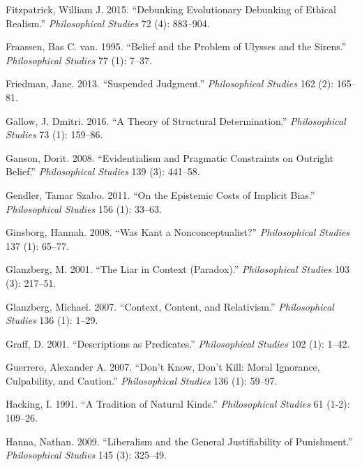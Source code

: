 \documentclass[
  10pt,
  letterpaper,
  DIV=11,
  numbers=noendperiod,
  twoside]{scrartcl}
\newlength{\cslhangindent}
\newenvironment{CSLReferences}[2] %
 {\begin{list}{}{%
  \setlength{\itemindent}{0pt}
  \setlength{\leftmargin}{0pt}
  \setlength{\parsep}{0pt}
  \ifodd #1
   \setlength{\leftmargin}{\cslhangindent}
   \setlength{\itemindent}{-1\cslhangindent}
  \fi
  \setlength{\itemsep}{#2\baselineskip}}}
 {\end{list}}
\begin{document}
\begin{CSLReferences}{1}{0}
Fitzpatrick, William J. 2015. {``Debunking Evolutionary Debunking of
Ethical Realism.''} \emph{Philosophical Studies} 72 (4): 883--904.

Fraassen, Bas C. van. 1995. {``Belief and the Problem of Ulysses and the
Sirens.''} \emph{Philosophical Studies} 77 (1): 7--37.

Friedman, Jane. 2013. {``Suspended Judgment.''} \emph{Philosophical
Studies} 162 (2): 165--81.

Gallow, J. Dmitri. 2016. {``A Theory of Structural Determination.''}
\emph{Philosophical Studies} 73 (1): 159--86.

Ganson, Dorit. 2008. {``Evidentialism and Pragmatic Constraints on
Outright Belief.''} \emph{Philosophical Studies} 139 (3): 441--58.

Gendler, Tamar Szabo. 2011. {``On the Epistemic Costs of Implicit
Bias.''} \emph{Philosophical Studies} 156 (1): 33--63.

Ginsborg, Hannah. 2008. {``Was Kant a Nonconceptualist?''}
\emph{Philosophical Studies} 137 (1): 65--77.

Glanzberg, M. 2001. {``The Liar in Context (Paradox).''}
\emph{Philosophical Studies} 103 (3): 217--51.

Glanzberg, Michael. 2007. {``Context, Content, and Relativism.''}
\emph{Philosophical Studies} 136 (1): 1--29.

Graff, D. 2001. {``Descriptions as Predicates.''} \emph{Philosophical
Studies} 102 (1): 1--42.

Guerrero, Alexander A. 2007. {``Don't Know, Don't Kill: Moral Ignorance,
Culpability, and Caution.''} \emph{Philosophical Studies} 136 (1):
59--97.

Hacking, I. 1991. {``A Tradition of Natural Kinds.''}
\emph{Philosophical Studies} 61 (1-2): 109--26.

Hanna, Nathan. 2009. {``Liberalism and the General Justifiability of
Punishment.''} \emph{Philosophical Studies} 145 (3): 325--49.


\end{CSLReferences}
\end{document}
